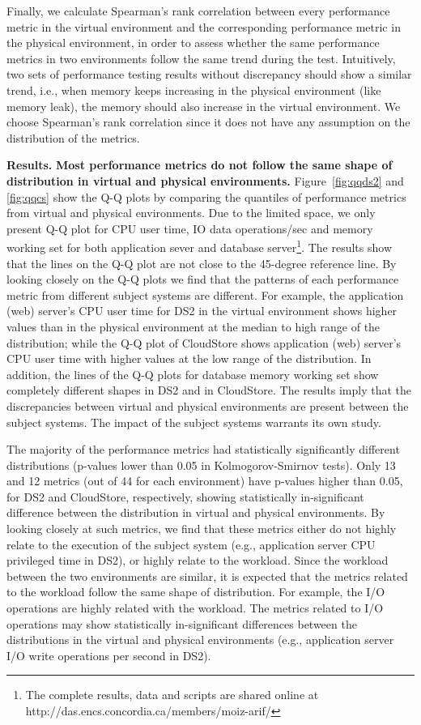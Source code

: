 \documentclass[smallextended]{svjour3}       %
\begin{document}
Finally, we calculate Spearman's rank correlation between every performance metric in the virtual environment and the corresponding performance metric in the physical environment, in order to assess whether the same performance metrics in two environments follow the same trend during the test. Intuitively, two sets of performance testing results without discrepancy should show a similar trend, i.e., when memory keeps increasing in the physical environment (like memory leak), the memory should also increase in the virtual environment. We choose Spearman's rank correlation since it does not have any assumption on the distribution of the metrics. 

\noindent \textbf{Results.}
\textbf{Most performance metrics do not follow the same shape of distribution in virtual and physical environments.} Figure~\ref{fig:qqds2} and \ref{fig:qqcs} show the Q-Q plots by comparing the quantiles of performance metrics from virtual and physical environments. Due to the limited space, we only present Q-Q plot for CPU user time, IO data operations/sec and memory working set for both application sever and database server\footnote{The complete results, data and scripts are shared online at http://das.encs.concordia.ca/members/moiz-arif/}. The results show that the lines on the Q-Q plot are not close to the 45-degree reference line. By looking closely on the Q-Q plots we find that the patterns of each performance metric from different subject systems are different. For example, the application (web) server's CPU user time for DS2 in the virtual environment shows higher values than in the physical environment at the median to high range of the distribution; while the Q-Q plot of CloudStore shows application (web) server's CPU user time with higher values at the low range of the distribution. In addition, the lines of the Q-Q plots for database memory working set show completely different shapes in DS2 and in CloudStore. The results imply that the discrepancies between virtual and physical environments are present between the subject systems. The impact of the subject systems warrants its own study.

The majority of the performance metrics had statistically significantly different distributions (p-values lower than 0.05 in Kolmogorov-Smirnov tests). Only 13 and 12 metrics (out of 44 for each environment) have p-values higher than 0.05, for DS2 and CloudStore, respectively, showing statistically in-significant difference between the distribution in virtual and physical environments. By looking closely at such metrics, we find that these metrics either do not highly relate to the execution of the subject system (e.g., application server CPU privileged time in DS2), or highly relate to the workload. Since the workload between the two environments are similar, it is expected that the metrics related to the workload follow the same shape of distribution. For example, the I/O operations are highly related with the workload. The metrics related to I/O operations may show statistically in-significant differences between the distributions in the virtual and physical environments (e.g., application server I/O write operations per second in DS2). %
\end{document}
